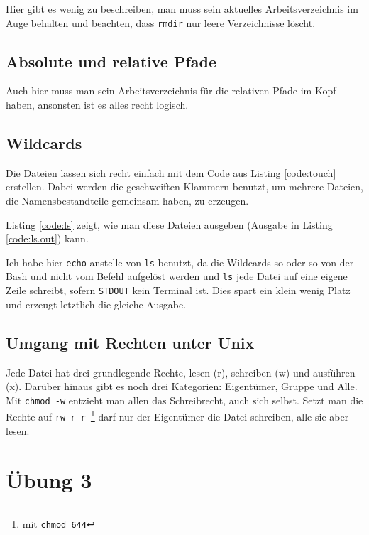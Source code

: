 Hier gibt es wenig zu beschreiben, man muss sein aktuelles Arbeitsverzeichnis im Auge behalten und beachten, dass \texttt{rmdir} nur leere Verzeichnisse löscht.

\section{Absolute und relative Pfade}

Auch hier muss man sein Arbeitsverzeichnis für die relativen Pfade im Kopf haben, ansonsten ist es alles recht logisch.

\section{Wildcards}

Die Dateien lassen sich recht einfach mit dem Code aus Listing \ref{code:touch} erstellen. Dabei werden die geschweiften Klammern benutzt, um mehrere Dateien, die Namensbestandteile gemeinsam haben, zu erzeugen.


Listing \ref{code:ls} zeigt, wie man diese Dateien ausgeben (Ausgabe in Listing \ref{code:ls.out}) kann.


Ich habe hier \texttt{echo} anstelle von \texttt{ls} benutzt, da die Wildcards so oder so von der Bash und nicht vom Befehl aufgelöst werden und \texttt{ls} jede Datei auf eine eigene Zeile schreibt, sofern \texttt{STDOUT} kein Terminal ist. Dies spart ein klein wenig Platz und erzeugt letztlich die gleiche Ausgabe.

\section{Umgang mit Rechten unter Unix}

Jede Datei hat drei grundlegende Rechte, lesen (r), schreiben (w) und ausführen (x). Darüber hinaus gibt es noch drei Kategorien: Eigentümer, Gruppe und Alle. Mit \texttt{chmod -w} entzieht man allen das Schreibrecht, auch sich selbst. Setzt man die Rechte auf \texttt{rw-r--r--}\footnote{mit \texttt{chmod 644}} darf nur der Eigentümer die Datei schreiben, alle sie aber lesen.

\chapter{Übung 3}

